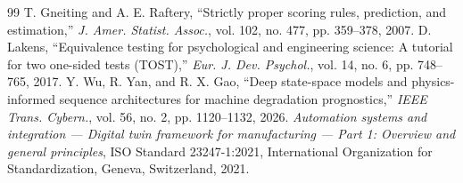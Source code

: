 \documentclass[12pt,a4paper]{article}
\begin{document}
\begin{thebibliography}{99}
 T. Gneiting and A. E. Raftery, ``Strictly proper scoring rules, prediction, and estimation,'' \textit{J. Amer. Statist. Assoc.}, vol. 102, no. 477, pp. 359--378, 2007.
 D. Lakens, ``Equivalence testing for psychological and engineering science: A tutorial for two one-sided tests (TOST),'' \textit{Eur. J. Dev. Psychol.}, vol. 14, no. 6, pp. 748--765, 2017.
 Y. Wu, R. Yan, and R. X. Gao, ``Deep state-space models and physics-informed sequence architectures for machine degradation prognostics,'' \textit{IEEE Trans. Cybern.}, vol. 56, no. 2, pp. 1120--1132, 2026.
 \textit{Automation systems and integration --- Digital twin framework for manufacturing --- Part 1: Overview and general principles}, ISO Standard 23247-1:2021, International Organization for Standardization, Geneva, Switzerland, 2021.
\end{thebibliography}
\end{document}
